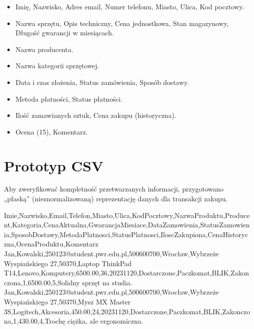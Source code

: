 \documentclass[letterpaper,10pt,polish]{sphinxmanual}
\begin{document}
\sphinxAtStartPar
{}
\begin{itemize}
\item {} 
\sphinxAtStartPar
{} Imię, Nazwisko, Adres e\sphinxhyphen{}mail, Numer telefonu, Miasto, Ulica, Kod pocztowy.

\item {} 
\sphinxAtStartPar
{} Nazwa sprzętu, Opis techniczny, Cena jednostkowa, Stan magazynowy, Długość gwarancji w miesiącach.

\item {} 
\sphinxAtStartPar
{} Nazwa producenta.

\item {} 
\sphinxAtStartPar
{} Nazwa kategorii sprzętowej.

\item {} 
\sphinxAtStartPar
{} Data i czas złożenia, Status zamówienia, Sposób dostawy.

\item {} 
\sphinxAtStartPar
{} Metoda płatności, Status płatności.

\item {} 
\sphinxAtStartPar
{} Ilość zamawianych sztuk, Cena zakupu (historyczna).

\item {} 
\sphinxAtStartPar
{} Ocena (1\sphinxhyphen{}5), Komentarz.

\end{itemize}


\section{Prototyp CSV}
\label{\detokenize{rozdzia_u0142_3/BD_PlanBazyDanych_zad1/index:prototyp-csv}}
\sphinxAtStartPar
Aby zweryfikować kompletność przetwarzanych informacji, przygotowano „płaską” (nieznormalizowaną) reprezentację danych dla transakcji zakupu.

\begin{sphinxVerbatim}[commandchars=\\\{\}]
Imie,Nazwisko,Email,Telefon,Miasto,Ulica,Kod\PYGZus{}Pocztowy,Nazwa\PYGZus{}Produktu,Producent,Kategoria,Cena\PYGZus{}Aktualna,Gwarancja\PYGZus{}Miesiace,Data\PYGZus{}Zamowienia,Status\PYGZus{}Zamowienia,Sposob\PYGZus{}Dostawy,Metoda\PYGZus{}Platnosci,Status\PYGZus{}Platnosci,Ilosc\PYGZus{}Zakupiona,Cena\PYGZus{}Historyczna,Ocena\PYGZus{}Produktu,Komentarz
Jan,Kowalski,250123@student.pwr.edu.pl,500600700,Wrocław,Wybrzeże Wyspiańskiego 27,50\PYGZhy{}370,Laptop ThinkPad T14,Lenovo,Komputery,6500.00,36,2023\PYGZhy{}11\PYGZhy{}20,Dostarczone,Paczkomat,BLIK,Zakonczona,1,6500.00,5,\PYGZdq{}Solidny sprzęt na studia.\PYGZdq{}
Jan,Kowalski,250123@student.pwr.edu.pl,500600700,Wrocław,Wybrzeże Wyspiańskiego 27,50\PYGZhy{}370,Mysz MX Master 3S,Logitech,Akcesoria,450.00,24,2023\PYGZhy{}11\PYGZhy{}20,Dostarczone,Paczkomat,BLIK,Zakonczona,1,430.00,4,\PYGZdq{}Trochę ciężka, ale ergonomiczna.\PYGZdq{}
\end{sphinxVerbatim}
\end{document}
